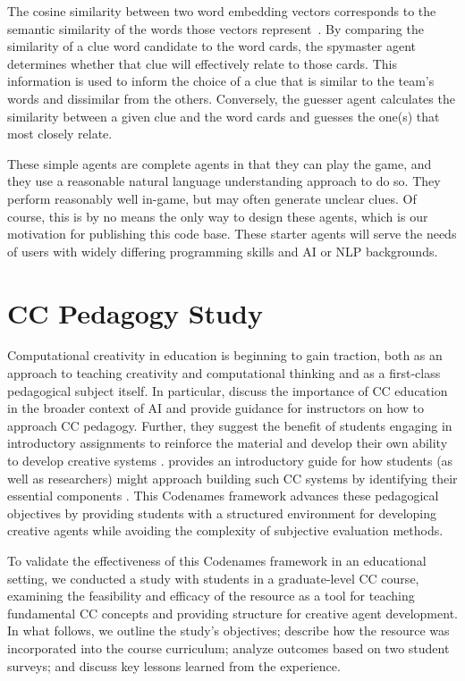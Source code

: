 \documentclass[phd,electronic,oneside,twosidetoc,letterpaper,chaptercenter,parttop,lof]{byumsphd}
\begin{document}
The cosine similarity between two word embedding vectors corresponds to the semantic similarity of the words those vectors represent~\cite{orkphol2019word}. By comparing the similarity of a clue word candidate to the word cards, the spymaster agent determines whether that clue will effectively relate to those cards. This information is used to inform the choice of a clue that is similar to the team's words and dissimilar from the others. Conversely, the guesser agent calculates the similarity between a given clue and the word cards and guesses the one(s) that most closely relate.

These simple agents are complete agents in that they can play the game, and they use a reasonable natural language understanding approach to do so. They perform reasonably well in-game, but may often generate unclear clues. Of course, this is by no means the only way to design these agents, which is our motivation for publishing this code base. These starter agents will serve the needs of users with widely differing programming skills and AI or NLP backgrounds.



\section{CC Pedagogy Study}

Computational creativity in education is beginning to gain traction, both as an approach to teaching creativity and computational thinking \cite{kakavas2019,fragapane2021,yee-king2024} and as a first-class pedagogical subject itself.  In particular, \citeauthor{ackerman2017teaching} discuss the importance of CC education in the broader context of AI and provide guidance for instructors on how to approach CC pedagogy. Further, they suggest the benefit of students engaging in introductory assignments to reinforce the material and develop their own ability to develop creative systems \cite{ackerman2017teaching}. \citeauthor{ventura2017howto} provides an introductory guide for how students (as well as researchers) might approach building such CC systems by identifying their essential components \cite{ventura2017howto}. This Codenames framework advances these pedagogical objectives by providing students with a structured environment for developing creative agents while avoiding the complexity of subjective evaluation methods.

To validate the effectiveness of this Codenames framework in an educational setting, we conducted a study with students in a graduate-level CC course, examining the feasibility and efficacy of the resource as a tool for teaching fundamental CC concepts and providing structure for creative agent development.  In what follows, we outline the study's objectives;  describe how the resource was incorporated into the course curriculum; analyze outcomes based on two student surveys; and discuss key lessons learned from the experience.
\end{document}
